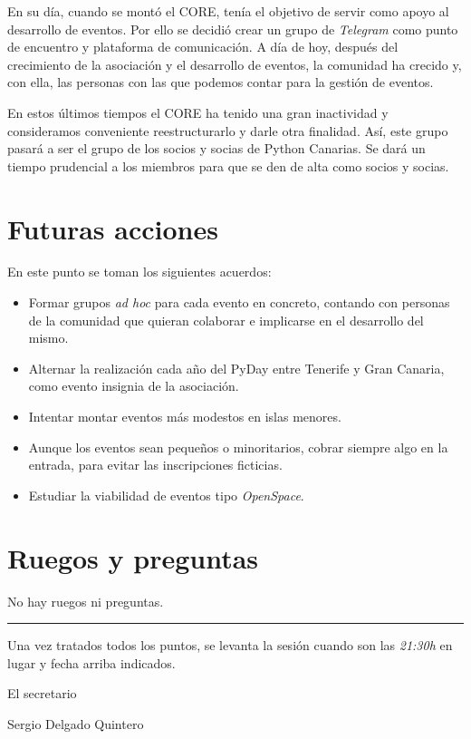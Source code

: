 \documentclass[a4paper, 12pt]{article}
\begin{document}
En su día, cuando se montó el CORE, tenía el objetivo de servir como apoyo al desarrollo de eventos. Por ello se decidió crear un grupo de \textit{Telegram} como punto de encuentro y plataforma de comunicación. A día de hoy, después del crecimiento de la asociación y el desarrollo de eventos, la comunidad ha crecido y, con ella, las personas con las que podemos contar para la gestión de eventos.

En estos últimos tiempos el CORE ha tenido una gran inactividad y consideramos conveniente reestructurarlo y darle otra finalidad. Así, este grupo pasará a ser el grupo de los socios y socias de Python Canarias. Se dará un tiempo prudencial a los miembros para que se den de alta como socios y socias.

\section{Futuras acciones}

En este punto se toman los siguientes acuerdos:
\begin{itemize}
    \item Formar grupos \textit{ad hoc} para cada evento en concreto, contando con personas de la comunidad que quieran colaborar e implicarse en el desarrollo del mismo.
    \item Alternar la realización cada año del PyDay entre Tenerife y Gran Canaria, como evento insignia de la asociación.
    \item Intentar montar eventos más modestos en islas menores.
    \item Aunque los eventos sean pequeños o minoritarios, cobrar siempre algo en la entrada, para evitar las inscripciones ficticias.
    \item Estudiar la viabilidad de eventos tipo \textit{OpenSpace}.
\end{itemize}

\section{Ruegos y preguntas}

No hay ruegos ni preguntas.


\vspace{1cm}
\hrule
\vspace{3mm}

Una vez tratados todos los puntos, se levanta la sesión cuando son las \textit{21:30h} en lugar y fecha arriba indicados.

\begin{flushright}
El secretario

Sergio Delgado Quintero
\end{flushright}
\end{document}
